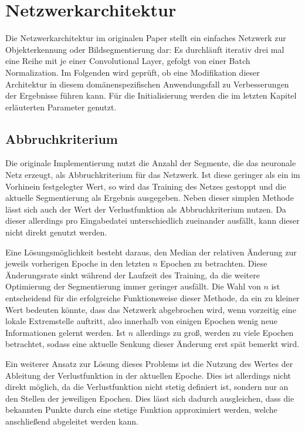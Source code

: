 \section{Netzwerkarchitektur}
\label{sec:network_architecture}

Die Netzwerkarchitektur im originalen Paper stellt ein einfaches Netzwerk zur Objekterkennung oder Bildsegmentierung dar: Es durchläuft iterativ drei mal eine Reihe mit je einer Convolutional Layer, gefolgt von einer Batch Normalization. Im Folgenden wird geprüft, ob eine Modifikation dieser Architektur in diesem domänenspezifischen Anwendungsfall zu Verbesserungen der Ergebnisse führen kann. Für die Initialisierung werden die im letzten Kapitel erläuterten Parameter genutzt.

\subsection{Abbruchkriterium}
\label{ssec:stoppingcriteria}

Die originale Implementierung nutzt die Anzahl der Segmente, die das neuronale Netz erzeugt, als Abbruchkriterium für das Netzwerk. Ist diese geringer als ein im Vorhinein festgelegter Wert, so wird das Training des Netzes gestoppt und die aktuelle Segmentierung als Ergebnis ausgegeben. Neben dieser simplen Methode lässt sich auch der Wert der Verlustfunktion als Abbruchkriterium nutzen. Da dieser allerdings pro Eingabedatei unterschiedlich zueinander ausfällt, kann dieser nicht direkt genutzt werden.

Eine Lösungsmöglichkeit besteht daraus, den Median der relativen Änderung zur jeweils vorherigen Epoche in den letzten $n$ Epochen zu betrachten. Diese Änderungsrate sinkt während der Laufzeit des Training, da die weitere Optimierung der Segmentierung immer geringer ausfällt. Die Wahl von $n$ ist entscheidend für die erfolgreiche Funktionsweise dieser Methode, da ein zu kleiner Wert bedeuten könnte, dass das Netzwerk abgebrochen wird, wenn vorzeitig eine lokale Extremstelle auftritt, also \zB innerhalb von einigen Epochen wenig neue Informationen gelernt werden. Ist $n$ allerdings zu groß, werden zu viele Epochen betrachtet, sodass eine aktuelle Senkung dieser Änderung erst spät bemerkt wird.

Ein weiterer Ansatz zur Lösung dieses Problems ist die Nutzung des Wertes der Ableitung der Verlustfunktion in der aktuellen Epoche. Dies ist allerdings nicht direkt möglich, da die Verlustfunktion nicht stetig definiert ist, sondern nur an den Stellen der jeweiligen Epochen. Dies lässt sich dadurch ausgleichen, dass die bekannten Punkte durch eine stetige Funktion approximiert werden, welche anschließend abgeleitet werden kann.

